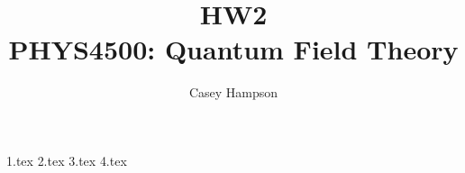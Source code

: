 \documentclass[titlepage]{article}
\title{HW2 \\[5pt] PHYS4500: Quantum Field Theory}
\author{Casey Hampson}
\begin{document}
    \maketitle
    \pagebreak

    {1.tex}
    {2.tex}
    {3.tex}
    {4.tex}
\end{document}
